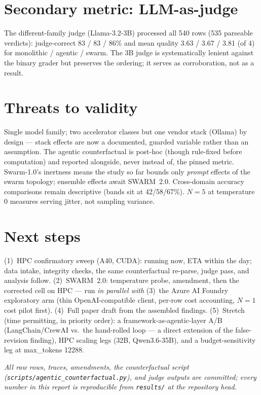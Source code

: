 \documentclass[sigconf,nonacm]{acmart}
\begin{document}
\section{Secondary metric: LLM-as-judge}
The different-family judge (Llama-3.2-3B) processed all 540 rows (535 parseable
verdicts): judge-correct 83 / 83 / 86\% and mean quality 3.63 / 3.67 / 3.81 (of 4)
for monolithic / agentic / swarm. The
3B judge is systematically lenient against the binary grader but preserves the
ordering; it serves as corroboration, not as a result.

\section{Threats to validity}
Single model family; two accelerator classes but one vendor stack (Ollama) by design
--- stack effects are now a documented, guarded variable rather than an assumption.
The agentic counterfactual is post-hoc (though rule-fixed before computation) and
reported alongside, never instead of, the pinned metric. Swarm-1.0's inertness means
the study so far bounds only \emph{prompt} effects of the swarm topology;
ensemble effects await SWARM~2.0. Cross-domain accuracy comparisons remain
descriptive (bands sit at 42/58/67\%). $N{=}5$ at temperature 0 measures serving
jitter, not sampling variance.

\section{Next steps}
(1)~HPC confirmatory sweep (A40, CUDA): running now, ETA within the day; data intake,
integrity checks, the same counterfactual re-parse, judge pass, and analysis follow.
(2)~SWARM~2.0: temperature probe, amendment, then the corrected cell on HPC ---
run \emph{in parallel with} (3)~the Azure AI Foundry exploratory arm (thin
OpenAI-compatible client, per-row cost accounting, $N{=}1$ cost pilot first).
(4)~Full paper draft from the assembled findings. (5)~Stretch (time permitting, in
priority order): a framework-as-agentic-layer A/B (LangChain/CrewAI vs.\ the
hand-rolled loop --- a direct extension of the false-revision finding), HPC scaling
legs (32B, Qwen3.6-35B), and a budget-sensitivity leg at max\_tokens 12288.

\vspace{1em}
\noindent\textit{All raw rows, traces, amendments, the counterfactual script
(\texttt{scripts/agentic\_counterfactual.py}), and judge outputs are committed; every
number in this report is reproducible from \texttt{results/} at the repository head.}
\end{document}
